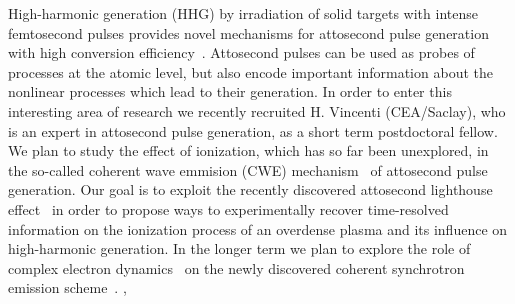 \documentclass[11pt,a4paper,final]{moderncv}
\begin{document}
High-harmonic generation (HHG) by irradiation of solid targets with intense femtosecond pulses 
provides novel mechanisms for attosecond pulse
generation with high conversion efficiency~\cite{teubner09}. Attosecond pulses can be used as probes of 
processes at the atomic level, but also encode important information
about the nonlinear processes which lead to their generation. 
In order to enter this interesting area of research we recently recruited
H. Vincenti (CEA/Saclay), who is an expert in
attosecond pulse generation, as a short term postdoctoral fellow.
We plan to study the effect of ionization, which has so far been unexplored,
in the so-called coherent wave emmision (CWE) mechanism~\cite{borot12} of attosecond pulse generation. 
Our goal is to exploit the recently discovered attosecond lighthouse effect~\cite{vincenti12,wheeler12} 
in order to propose ways to experimentally recover time-resolved information 
on the ionization process of an overdense plasma and its influence on high-harmonic generation.
In the longer term we plan to explore the role of complex electron dynamics~\cite{sanz12} on the
newly discovered coherent synchrotron emission scheme~\cite{dromey12}. 
\sep
\end{document}
